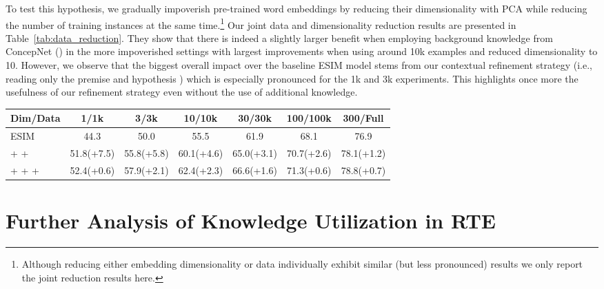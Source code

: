 \documentclass[11pt,a4paper]{article}
\begin{document}
To test this hypothesis, we gradually impoverish pre-trained word embeddings by reducing their dimensionality with PCA while reducing the number of training instances at the same time.\footnote{Although reducing either embedding dimensionality or data individually exhibit similar (but less pronounced) results we only report the joint reduction results here.} Our joint data and dimensionality reduction results are presented in Table~\ref{tab:data_reduction}. They show that there is indeed a slightly larger benefit when employing background knowledge from ConcepNet () in the more impoverished settings with largest improvements when using around 10k examples and reduced dimensionality to 10. However, we observe that the biggest overall impact over the baseline ESIM model stems from our contextual refinement strategy (i.e., reading only the premise   and hypothesis ) which is especially pronounced for the 1k and 3k experiments. This highlights once more the usefulness of our refinement strategy even without the use of additional knowledge. 

\begin{table*}[t]
    \small
    \centering
        \begin{tabular}{l c c c c c c}
            \toprule
            Dim/Data & 1/1k & 3/3k & 10/10k & 30/30k & 100/100k & 300/Full \\ 
            \midrule
            ESIM & 44.3 & 50.0 & 55.5 & 61.9 & 68.1 & 76.9 \\
            +  +  & 51.8(+7.5) & 55.8(+5.8) & 60.1(+4.6) & 65.0(+3.1) & 70.7(+2.6) & 78.1(+1.2) \\
            +  +  +  & 52.4(+0.6) & 57.9(+2.1) & 62.4(+2.3) & 66.6(+1.6) & 71.3(+0.6) & 78.8(+0.7) \\
            \bottomrule
        \end{tabular}    
        \caption{Development set results for MultiNLI (Matched + Mismatched) when reducing training data and embedding dimensionality with PCA. In parenthesis we report the relative differences to the respective result directly above.}\label{tab:data_reduction}
\end{table*}


\section{Further Analysis of Knowledge Utilization in RTE}
\label{sec:additional_analysis}
\end{document}
